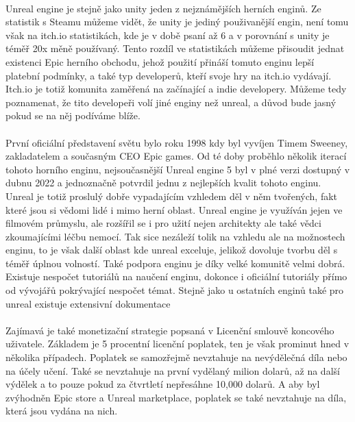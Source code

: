 \paragraph{}
	Unreal engine\cite{unreal_engine} je stejně jako unity jeden z nejznámějších herních enginů.
	Ze statistik s Steamu\cite{steamdb_engines} můžeme vidět, že unity je jediný použivanější engin, není tomu však na itch.io statistikách\cite{itch_io_engines}, kde je v době psaní až 6 a v porovnání s unity je téměř 20x měně používaný.
	Tento rozdíl ve statistikách můžeme přisoudit jednat existenci Epic herního obchodu, jehož použití přináší tomuto enginu lepší platební podmínky, a také typ developerů, kteří svoje hry na itch.io vydávají.
	Itch.io je totiž komunita zaměřená na začínající a indie developery.
	Můžeme tedy poznamenat, že tito developeři volí jiné enginy než unreal, a důvod bude jasný pokud se na něj podíváme blíže.

\paragraph{}
	První oficiální představení světu bylo roku 1998 kdy byl vyvíjen Timem Sweeney\cite{tim_sweeney_wiki}, zakladatelem a současným \ac{CEO} Epic games.
	Od té doby proběhlo několik iterací tohoto horního enginu, nejsoučasnější Unreal engine 5 byl v plné verzi dostupný v dubnu 2022 a jednoznačně potvrdil jednu z nejlepších kvalit tohoto enginu.
	Unreal je totiž proslulý dobře vypadajícím vzhledem děl v něm tvořených, fakt které jsou si vědomi lidé i mimo herní oblast.
	Unreal engine je využíván jejen ve filmovém průmyslu, ale rozšířil se i pro užití nejen architekty\cite{architects_use_unreal} ale také vědci zkoumajícími léčbu nemocí\cite{medicine_use_unreal}.
	Tak sice nezáleží tolik na vzhledu ale na možnostech enginu, to je však další oblast kde unreal exceluje, jelikož dovoluje tvorbu děl s téměř úplnou volností.
	Také podpora enginu je díky velké komunitě velmi dobrá.
	Existuje nespočet tutoriálů na naučení enginu, dokonce i oficiální tutoriály přímo od vývojářů pokrývající nespočet témat\cite{unreal_courses}.
	Stejně jako u ostatních enginů také pro unreal existuje extensivní dokumentace\cite{unreal_dokumentace}

\paragraph{}
	Zajímavá je také monetizační strategie popsaná v Licenční smlouvě koncového uživatele\cite{unreal_eula}.
	Základem je 5 procentní licenční poplatek, ten je však prominut hned v několika případech.
	Poplatek se samozřejmě nevztahuje na nevýdělečná díla nebo na účely učení.
	Také se nevztahuje na první vydělaný milion dolarů, až na další výdělek a to pouze pokud za čtvrtletí nepřesáhne 10,000 dolarů.
	A aby byl zvýhodněn Epic store a Unreal marketplace, poplatek se také nevztahuje na díla, která jsou vydána na nich.


